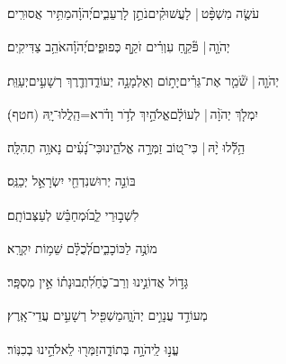 \documentclass[12pt]{article}
\newcommand{\loc}[1]{\textsuperscript{\locf{#1}}}
\begin{document}
{\loc{ ז}~}‏עֹשֶׂ֤ה מִשְׁפָּ֨ט |  לָעֲשׁוּקִ֗ים{\hfill}נֹתֵ֣ן  לָרְעֵבִ֑ים\newline\hspace*{.5em}יְ֝הֹוָ֗ה{\hfill}מַתִּ֥יר אֲסוּרִֽים׃\par

{\loc{ ח}~}‏יְהֹוָ֤ה |  פֹּ֘קֵ֤חַ עִוְרִ֗ים{\hfill} זֹקֵ֣ף כְּפוּפִ֑ים\newline\hspace*{.5em}יְ֝הֹוָ֗ה{\hfill}אֹהֵ֥ב צַדִּיקִֽים׃\par

{\loc{ ט}~}‏יְהֹוָ֤ה |  שֹׁ֘מֵ֤ר אֶת־גֵּרִ֗ים{\hfill}יָת֣וֹם וְאַלְמָנָ֣ה יְעוֹדֵ֑ד\newline\hspace*{.5em}וְדֶ֖רֶךְ רְשָׁעִ֣ים{\hfill}יְעַוֵּֽת׃\par

{\loc{ י}~}‏יִמְלֹ֤ךְ יְהֹוָ֨ה |  לְעוֹלָ֗ם{\hfill}אֱלֹהַ֣יִךְ \newline\hspace*{.5em}לְדֹ֥ר וָדֹ֗ר{\hfill}א=הַֽלֲלוּ־יָֽהּ (חטף)׃\par\pend
\ledpb
\pstart[\subsection*{\textcolor{red}{פרק קמז}}]\label{פרק קמז}
{\loc{ א}~}‏הַ֥לְﬞלוּ יָ֨הּ | \newline\hspace*{.5em}כִּי־ט֭וֹב זַמְּרָ֣ה אֱלֹהֵ֑ינוּ{\hfill}כִּי־נָ֝עִ֗ים נָאוָ֥ה תְהִלָּֽה׃\par

{\loc{ ב}~}‏בּוֹנֵ֣ה יְרוּשׁ{\hfill}נִדְחֵ֖י יִשְׂרָאֵ֣ל יְכַנֵּֽס׃\par

{\loc{ ג}~}‏ לִשְׁב֣וּרֵי לֵ֑ב{\hfill}וּ֝מְחַבֵּ֗שׁ לְעַצְּבוֹתָֽם׃\par

{\loc{ ד}~}‏מוֹנֶ֣ה  לַכּוֹכָבִ֑ים{\hfill}לְ֝כֻלָּ֗ם שֵׁמ֥וֹת יִקְרָֽא׃\par

{\loc{ ה}~}‏גָּד֣וֹל אֲדוֹנֵ֣ינוּ וְרַב־כֹּ֑חַ{\hfill}לִ֝תְבוּנָת֗וֹ אֵ֣ין מִסְפָּֽר׃\par

{\loc{ ו}~}‏מְעוֹדֵ֣ד עֲנָוִ֣ים יְהֹוָ֑ה{\hfill}מַשְׁפִּ֖יל רְשָׁעִ֣ים עֲדֵי־אָֽרֶץ׃\par

{\loc{ ז}~}‏עֱנ֣וּ לַֽיהֹוָ֣ה בְּתוֹדָ֑ה{\hfill}זַמְּר֖וּ לֵאלֹהֵ֣ינוּ בְכִנּֽוֹר׃\par
\end{document}
